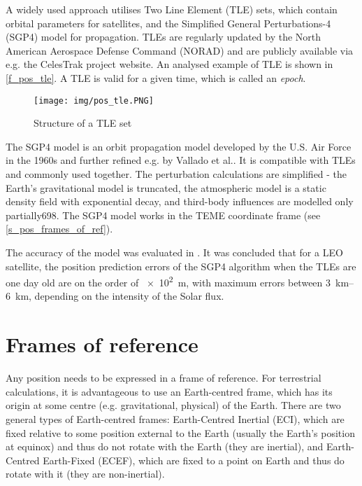A widely used approach utilises Two Line Element (TLE) sets, which contain orbital parameters for satellites, and the Simplified General Perturbations-4 (SGP4) model for propagation. TLEs are regularly updated by the North American Aerospace Defense Command (NORAD) and are publicly available via e.g. the CelesTrak project website\cite{des11}. An analysed example of TLE is shown in \autoref{f_pos_tle}. A TLE is valid for a given time, which is called an \textit{epoch}.

\begin{figure}
    \centering
    \texttt{[image: img/pos\_tle.PNG]}
    \caption{Structure of a TLE set\cite{pos06}}
    \label{f_pos_tle}
\end{figure}

The SGP4 model is an orbit propagation model developed by the U.S. Air Force in the 1960s and further refined e.g. by Vallado et al.\cite{des06}. It is compatible with TLEs and commonly used together. The perturbation calculations are simplified - the Earth’s gravitational model is truncated, the atmospheric model is a static density field with exponential decay, and third-body influences are modelled only partially\citep{pos01}{698}. The SGP4 model works in the TEME coordinate frame (see \autoref{s_pos_frames_of_ref}).

The accuracy of the model was evaluated in \cite{pos07}. It was concluded that for a LEO satellite, the position prediction errors of the SGP4 algorithm when the TLEs are one day old are on the order of \qty{e2}{m}, with maximum errors between \qtyrange{3}{6}{km}, depending on the intensity of the Solar flux.



\section{Frames of reference}
\label{s_pos_frames_of_ref}
Any position needs to be expressed in a frame of reference. For terrestrial calculations, it is advantageous to use an Earth-centred frame, which has its origin at some centre (e.g. gravitational, physical) of the Earth. There are two general types of Earth-centred frames: Earth-Centred Inertial (ECI), which are fixed relative to some position external to the Earth (usually the Earth's position at equinox) and thus do not rotate with the Earth (they are inertial), and Earth-Centred Earth-Fixed (ECEF), which are fixed to a point on Earth and thus do rotate with it (they are non-inertial).

